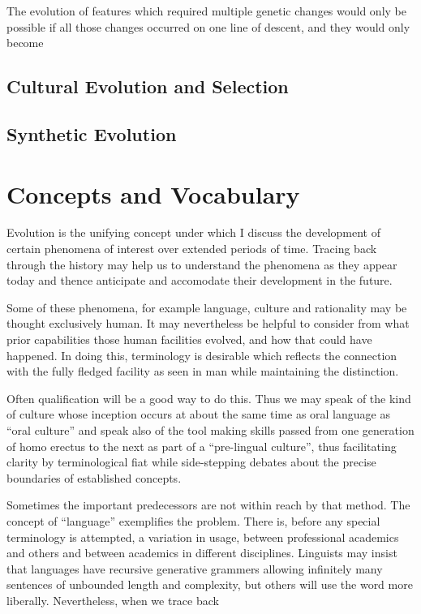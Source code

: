 \documentclass[10pt,titlepage]{book}
\begin{document}
The evolution of features which required multiple genetic changes would only be possible if all those changes occurred on one line of descent, and they would only become

\subsection{Cultural Evolution and Selection}

\subsection{Synthetic Evolution}
  
\section{Concepts and Vocabulary}

Evolution is the unifying concept under which I discuss the development of certain phenomena of interest over extended periods of time.
Tracing back through the history may help us to understand the phenomena as they appear today and thence anticipate and accomodate their development in the future.

Some of these phenomena, for example language, culture and rationality may be thought exclusively human.
It may nevertheless be helpful to consider from what prior capabilities those human facilities evolved, and how that could have happened.
In doing this, terminology is desirable which reflects the connection with the fully fledged facility as seen in man while maintaining the distinction.

Often qualification will be a good way to do this.
Thus we may speak of the kind of culture whose inception occurs at about the same time as oral language as ``oral culture'' and speak also of the tool making skills passed from one generation of homo erectus to the next as part of a ``pre-lingual culture'', thus facilitating clarity by terminological fiat while side-stepping debates about the precise boundaries of established concepts.

Sometimes the important predecessors are not within reach by that method.
The concept of ``language'' exemplifies the problem.
There is, before any special terminology is attempted, a variation in usage, between professional academics and others and between academics in different disciplines.
Linguists may insist that languages have recursive generative grammers allowing infinitely many sentences of unbounded length and complexity, but others will use the word more liberally.
Nevertheless, when we trace back 
\end{document}
